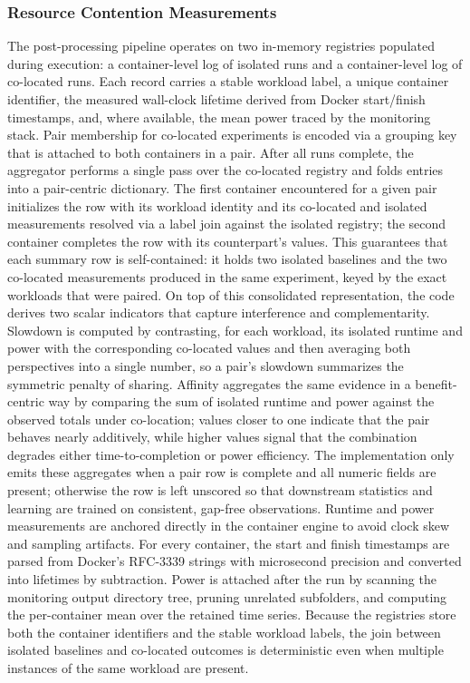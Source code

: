 \subsubsection{Resource Contention Measurements}
\label{sec:resource_contention_measurements}
The post-processing pipeline operates on two in-memory registries populated during execution: a container-level log of isolated runs and a container-level log of co-located runs. Each record carries a stable workload label, a unique container identifier, the measured wall-clock lifetime derived from Docker start/finish timestamps, and, where available, the mean power traced by the monitoring stack. Pair membership for co-located experiments is encoded via a grouping key that is attached to both containers in a pair. After all runs complete, the aggregator performs a single pass over the co-located registry and folds entries into a pair-centric dictionary. The first container encountered for a given pair initializes the row with its workload identity and its co-located and isolated measurements resolved via a label join against the isolated registry; the second container completes the row with its counterpart’s values. This guarantees that each summary row is self-contained: it holds two isolated baselines and the two co-located measurements produced in the same experiment, keyed by the exact workloads that were paired.
On top of this consolidated representation, the code derives two scalar indicators that capture interference and complementarity. Slowdown is computed by contrasting, for each workload, its isolated runtime and power with the corresponding co-located values and then averaging both perspectives into a single number, so a pair’s slowdown summarizes the symmetric penalty of sharing. Affinity aggregates the same evidence in a benefit-centric way by comparing the sum of isolated runtime and power against the observed totals under co-location; values closer to one indicate that the pair behaves nearly additively, while higher values signal that the combination degrades either time-to-completion or power efficiency. The implementation only emits these aggregates when a pair row is complete and all numeric fields are present; otherwise the row is left unscored so that downstream statistics and learning are trained on consistent, gap-free observations.
Runtime and power measurements are anchored directly in the container engine to avoid clock skew and sampling artifacts. For every container, the start and finish timestamps are parsed from Docker’s RFC-3339 strings with microsecond precision and converted into lifetimes by subtraction. Power is attached after the run by scanning the monitoring output directory tree, pruning unrelated subfolders, and computing the per-container mean over the retained time series. Because the registries store both the container identifiers and the stable workload labels, the join between isolated baselines and co-located outcomes is deterministic even when multiple instances of the same workload are present.
